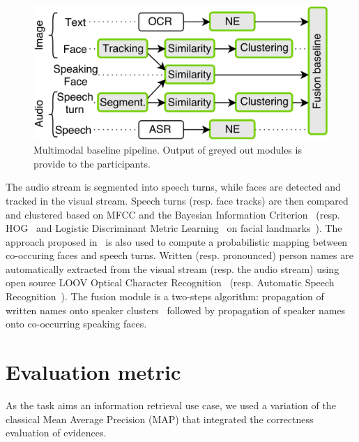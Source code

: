 \documentclass{acm_proc_article-me}
\begin{document}
\begin{figure}[htb]
 \center
 \includegraphics[width=1\linewidth]{figs/baseline.png}
 \centering
 \caption {Multimodal baseline pipeline. Output of greyed out modules is provide to the participants.}
 \label{fig:baseline}
\end{figure}

The audio stream is segmented into speech turns, while faces are detected and tracked in the visual stream.
Speech turns (resp. face tracks) are then compared and clustered based on MFCC and the Bayesian Information Criterion~\cite{CHEN--DARPA--1998} (resp. HOG~\cite{DALAL--CVPR--2005} and Logistic Discriminant Metric Learning~\cite{GUILLAUMIN--JCV--2012} on facial landmarks~\cite{URICAR--VISAPP--2012}). The approach proposed in~\cite{POIGNANT--MTAP--2015} is also used to compute a probabilistic mapping between co-occuring faces and speech turns. Written (resp. pronounced) person names are automatically extracted from the visual stream (resp. the audio stream) using open source LOOV Optical Character Recognition~\cite{POIGNANT--ICME--2012} (resp. Automatic Speech Recognition~\cite{LAMEL--IWSLT--2011, DIANRELLI--IJCNLP--2011}). The fusion module is a two-steps algorithm: propagation of written names onto speaker clusters~\cite{POIGNANT--INTERSPEECH--2012} followed by propagation of speaker names onto co-occurring speaking faces.

\section{Evaluation metric}
\label{sec:metric}

As the task aims an information retrieval use case, we used a variation of the classical Mean Average Precision (MAP) that integrated the correctness evaluation of evidences.
\end{document}
